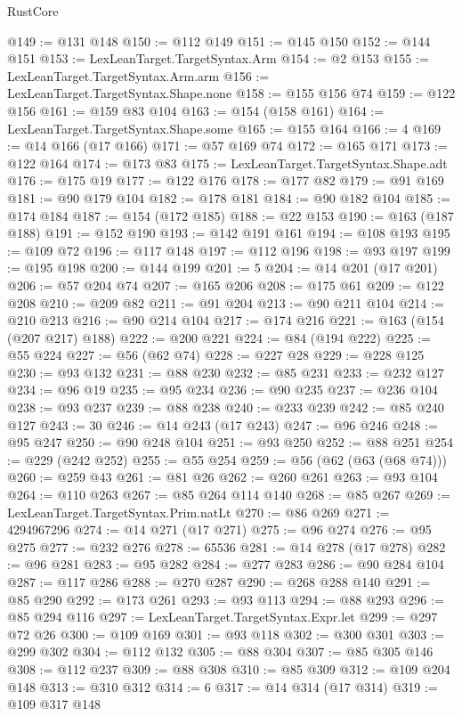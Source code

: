 \begin{lexlean}{RustCore}
\begin{coremodule}
@149 := @131 @148
@150 := @112 @149
@151 := @145 @150
@152 := @144 @151
@153 := LexLeanTarget.TargetSyntax.Arm
@154 := @2 @153
@155 := LexLeanTarget.TargetSyntax.Arm.arm
@156 := LexLeanTarget.TargetSyntax.Shape.none
@158 := @155 @156 @74
@159 := @122 @156
@161 := @159 @83 @104
@163 := @154 (@158 @161)
@164 := LexLeanTarget.TargetSyntax.Shape.some
@165 := @155 @164
@166 := 4
@169 := @14 @166 (@17 @166)
@171 := @57 @169 @74
@172 := @165 @171
@173 := @122 @164
@174 := @173 @83
@175 := LexLeanTarget.TargetSyntax.Shape.adt
@176 := @175 @19
@177 := @122 @176
@178 := @177 @82
@179 := @91 @169
@181 := @90 @179 @104
@182 := @178 @181
@184 := @90 @182 @104
@185 := @174 @184
@187 := @154 (@172 @185)
@188 := @22 @153
@190 := @163 (@187 @188)
@191 := @152 @190
@193 := @142 @191 @161
@194 := @108 @193
@195 := @109 @72
@196 := @117 @148
@197 := @112 @196
@198 := @93 @197
@199 := @195 @198
@200 := @144 @199
@201 := 5
@204 := @14 @201 (@17 @201)
@206 := @57 @204 @74
@207 := @165 @206
@208 := @175 @61
@209 := @122 @208
@210 := @209 @82
@211 := @91 @204
@213 := @90 @211 @104
@214 := @210 @213
@216 := @90 @214 @104
@217 := @174 @216
@221 := @163 (@154 (@207 @217) @188)
@222 := @200 @221
@224 := @84 (@194 @222)
@225 := @55 @224
@227 := @56 (@62 @74)
@228 := @227 @28
@229 := @228 @125
@230 := @93 @132
@231 := @88 @230
@232 := @85 @231
@233 := @232 @127
@234 := @96 @19
@235 := @95 @234
@236 := @90 @235
@237 := @236 @104
@238 := @93 @237
@239 := @88 @238
@240 := @233 @239
@242 := @85 @240 @127
@243 := 30
@246 := @14 @243 (@17 @243)
@247 := @96 @246
@248 := @95 @247
@250 := @90 @248 @104
@251 := @93 @250
@252 := @88 @251
@254 := @229 (@242 @252)
@255 := @55 @254
@259 := @56 (@62 (@63 (@68 @74)))
@260 := @259 @43
@261 := @81 @26
@262 := @260 @261
@263 := @93 @104
@264 := @110 @263
@267 := @85 @264 @114 @140
@268 := @85 @267
@269 := LexLeanTarget.TargetSyntax.Prim.natLt
@270 := @86 @269
@271 := 4294967296
@274 := @14 @271 (@17 @271)
@275 := @96 @274
@276 := @95 @275
@277 := @232 @276
@278 := 65536
@281 := @14 @278 (@17 @278)
@282 := @96 @281
@283 := @95 @282
@284 := @277 @283
@286 := @90 @284 @104
@287 := @117 @286
@288 := @270 @287
@290 := @268 @288 @140
@291 := @85 @290
@292 := @173 @261
@293 := @93 @113
@294 := @88 @293
@296 := @85 @294 @116
@297 := LexLeanTarget.TargetSyntax.Expr.let
@299 := @297 @72 @26
@300 := @109 @169
@301 := @93 @118
@302 := @300 @301
@303 := @299 @302
@304 := @112 @132
@305 := @88 @304
@307 := @85 @305 @146
@308 := @112 @237
@309 := @88 @308
@310 := @85 @309
@312 := @109 @204 @148
@313 := @310 @312
@314 := 6
@317 := @14 @314 (@17 @314)
@319 := @109 @317 @148

\end{coremodule}
\end{lexlean}

